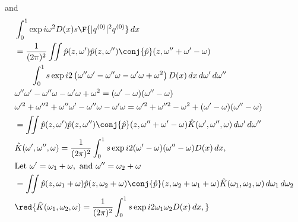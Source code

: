 and
\begin{equation}
\begin{split}
&\int_{0}^{1}\exp{i \omega^2 D(x)} s \F{|q^{(0)}|^2 q^{(0)}}\,dx \\
&= \frac{1}{(2\pi)^2} \iint \hat{p}(z,\omega')  \hat{p}(z,\omega'') \conj{\hat{p}}(z,\omega''+\omega'-\omega) \\
&\quad \quad \int_{0}^{1} s \exp{i 2\left( \omega'' \omega' - \omega'' \omega - \omega' \omega + \omega^2\right) D(x)} \,dx \,d\omega' \,d\omega'' \\
&\omega'' \omega' - \omega'' \omega - \omega' \omega + \omega^2 = (\omega'-\omega)(\omega''-\omega)\\
&\omega'^2 + \omega''^2 + \omega'' \omega' - \omega'' \omega - \omega' \omega = \omega'^2 + \omega''^2 - \omega^2 + (\omega'-\omega)(\omega''-\omega)\\
&= \iint \hat{p}(z,\omega')  \hat{p}(z,\omega'') \conj{\hat{p}}(z,\omega''+\omega'-\omega) \hat{K}(\omega',\omega'', \omega)  \,d\omega' \,d\omega'' \\
&  \hat{K}(\omega',\omega'',\omega) = \frac{1}{(2\pi)^2}\int_{0}^{1}s \exp{i2(\omega'-\omega)(\omega'' - \omega)D(x)}   \,dx,  \\
&\mbox{Let } \omega' =  \omega_1 + \omega, \mbox{ and } \omega'' = \omega_2+\omega\\
&= \iint \hat{p}(z, \omega_1 + \omega)  \hat{p}(z,\omega_2+\omega) \conj{\hat{p}}(z,\omega_2+\omega_1 + \omega) \hat{K}(\omega_1,\omega_2,\omega)  \,d\omega_1 \,d\omega_2 \\
&  \red{\hat{K}(\omega_1,\omega_2,\omega) = \frac{1}{(2\pi)^2}\int_{0}^{1}s \exp{i2\omega_1\omega_2 D(x)} \,dx,}  \\
\end{split}
\end{equation}

